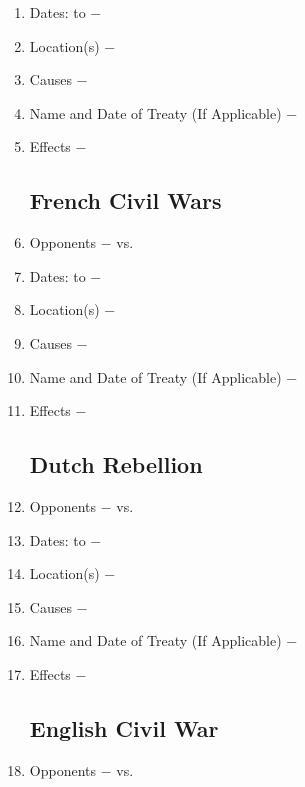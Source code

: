 \documentclass[12pt]{article}
\begin{document}
\begin{enumerate}
\item Dates: to $-$

\item Location(s) $-$ 

\item Causes $-$

\item Name and Date of Treaty (If Applicable) $-$ 

\item Effects $-$

\subsection{French Civil Wars}
 
\item Opponents $-$ vs.

\item Dates: to $-$

\item Location(s) $-$ 

\item Causes $-$

\item Name and Date of Treaty (If Applicable) $-$ 

\item Effects $-$

\subsection{Dutch Rebellion}

\item Opponents $-$ vs.

\item Dates: to $-$

\item Location(s) $-$ 

\item Causes $-$

\item Name and Date of Treaty (If Applicable) $-$ 

\item Effects $-$ 

\subsection{English Civil War}

\item Opponents $-$ vs.


\end{enumerate}
\end{document}
